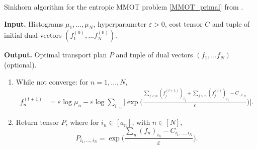 \begin{algorithm}[t]
  \caption{Sinkhorn algorithm for the entropic MMOT problem \eqref{MMOT_primal} from \citep{Benamou14}.}
  \textbf{Input.} Histograms $\mu_1,...,\mu_N$, hyperparameter $\varepsilon > 0$, cost tensor $C$ and
  tuple of initial dual vectors $(f^{(0)}_1, ... f^{(0)}_N)$.

  \textbf{Output.} Optimal transport plan $P$ and tuple of dual vectors $(f_1, ... f_N)$ (optional).
  \begin{enumerate}
    \item While not converge: for $n = 1, ..., N$,
    \begin{equation}
      \begin{split}
        f^{(t+1)}_n &= \varepsilon \log \mu_n - \varepsilon \log \sum_{i_{-n}}
        \Big[ \exp\Big( \frac{\sum_{j < n} (f^{(t+1)}_j)_{i_j} + \sum_{j > n} (f^{(t)}_j)_{i_j} -
        C_{\cdot, i_{-n}}}{\varepsilon} \Big) \Big].
      \end{split}
    \end{equation}
    \item Return tensor $P$, where for $i_n \in [a_n]$, with $n \in [N]$,
    \begin{equation}
      P_{i_1,...,i_N} = \exp\Big( \frac{\sum_n (f_n)_{i_n} - C_{i_1,...,i_N}}{\varepsilon} \Big).
    \end{equation}
  \end{enumerate}
  \label{algo:dual_mmot}
\end{algorithm}

